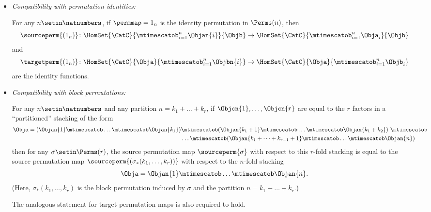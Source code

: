 \begin{ctdefinition}
\begin{itemize}
        \item \emph{Compatibility with permutation identities:}

              For any $n \setin\natnumbers$, if $\permmap = 1_n$ is the identity permutation in $\Perms(n)$, then
              \begin{equation}
                  \label{eq:perm-compatibility-with-perm-identity-1}
                  \sourceperm{(1_n)} \colon \HomSet{\CatC}{\mtimescatob_{i=1}^n \Objan{i}}{\Objb} \to \HomSet{\CatC}{\mtimescatob_{i=1}^n \Obja_{i}}{\Objb}
              \end{equation}
              and
              \begin{equation}
                  \label{eq:perm-compatibility-with-perm-identity-2}
                  \targetperm{(1_n)} \colon \HomSet{\CatC}{\Obja}{\mtimescatob_{i=1}^n \Objbn{i}} \to \HomSet{\CatC}{\Obja}{\mtimescatob_{i=1}^n \Objb_i}
              \end{equation}
              are the identity functions.

        \item \emph{Compatibility with block permutations:}

              For any $n \setin\natnumbers$ and any partition $n = k_1 + \dots + k_r$, if $\Objcn{1}, \dots, \Objcn{r}$ are equal to the $r$ factors in a ``partitioned'' stacking of the form
              \begin{align*}
                  \Obja = (\Objan{1} \mtimescatob \dots \mtimescatob \Objan{k_1}) & \mtimescatob (\Objan{k_1 + 1} \mtimescatob \dots \mtimescatob \Objan{k_1 + k_2}) \ \mtimescatob \\ & \dots \mtimescatob (\Objan{k_1 + \dots + k_{r-1} +1} \mtimescatob \dots \mtimescatob \Objan{n})
              \end{align*}
              then for any $\sigma \setin\Perms(r)$, the source permutation map $\sourceperm{\sigma}$ with respect to this $r$-fold stacking is equal to the source permutation map $\sourceperm{(\sigma_*(k_1, \dots, k_r))}$ with respect to the $n$-fold stacking
              \begin{equation*}
                  \Obja = \Objan{1} \mtimescatob \dots \mtimescatob \Objan{n}.
              \end{equation*}
              (Here, $\sigma_*(k_1, \dots, k_r)$ is the block permutation induced by $\sigma$ and the partition $n = k_1 + \dots + k_r$.)

              The analogous statement for target permutation maps is also required to hold.


\end{itemize}
\end{ctdefinition}
